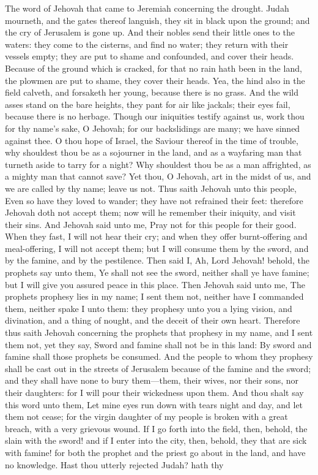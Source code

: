 The word of Jehovah that came to Jeremiah concerning the drought.  Judah mourneth, and the gates thereof languish, they sit in black upon the ground; and the cry of Jerusalem is gone up. And their nobles send their little ones to the waters: they come to the cisterns, and find no water; they return with their vessels empty; they are put to shame and confounded, and cover their heads. Because of the ground which is cracked, for that no rain hath been in the land, the plowmen are put to shame, they cover their heads. Yea, the hind also in the field calveth, and forsaketh her young, because there is no grass. And the wild asses stand on the bare heights, they pant for air like jackals; their eyes fail, because there is no herbage.  Though our iniquities testify against us, work thou for thy name’s sake, O Jehovah; for our backslidings are many; we have sinned against thee. O thou hope of Israel, the Saviour thereof in the time of trouble, why shouldest thou be as a sojourner in the land, and as a wayfaring man that turneth aside to tarry for a night? Why shouldest thou be as a man affrighted, as a mighty man that cannot save? Yet thou, O Jehovah, art in the midst of us, and we are called by thy name; leave us not.  Thus saith Jehovah unto this people, Even so have they loved to wander; they have not refrained their feet: therefore Jehovah doth not accept them; now will he remember their iniquity, and visit their sins. And Jehovah said unto me, Pray not for this people for their good. When they fast, I will not hear their cry; and when they offer burnt-offering and meal-offering, I will not accept them; but I will consume them by the sword, and by the famine, and by the pestilence.  Then said I, Ah, Lord Jehovah! behold, the prophets say unto them, Ye shall not see the sword, neither shall ye have famine; but I will give you assured peace in this place. Then Jehovah said unto me, The prophets prophesy lies in my name; I sent them not, neither have I commanded them, neither spake I unto them: they prophesy unto you a lying vision, and divination, and a thing of nought, and the deceit of their own heart. Therefore thus saith Jehovah concerning the prophets that prophesy in my name, and I sent them not, yet they say, Sword and famine shall not be in this land: By sword and famine shall those prophets be consumed. And the people to whom they prophesy shall be cast out in the streets of Jerusalem because of the famine and the sword; and they shall have none to bury them—them, their wives, nor their sons, nor their daughters: for I will pour their wickedness upon them. And thou shalt say this word unto them, Let mine eyes run down with tears night and day, and let them not cease; for the virgin daughter of my people is broken with a great breach, with a very grievous wound. If I go forth into the field, then, behold, the slain with the sword! and if I enter into the city, then, behold, they that are sick with famine! for both the prophet and the priest go about in the land, and have no knowledge.  Hast thou utterly rejected Judah? hath thy 